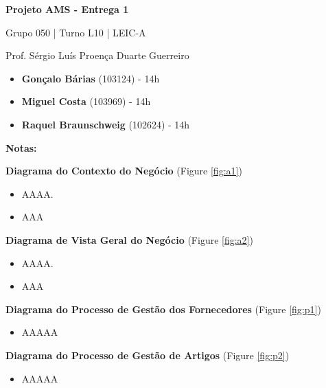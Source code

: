 \documentclass[12pt,a4paper]{article}
\begin{document}
\begin{titlepage}
  \begin{center}
    \vspace*{5cm}
    \Huge
    \textbf{Projeto AMS - Entrega 1}

    \vspace{0.5cm}
    \LARGE
    Grupo 050 | Turno L10 | LEIC-A

    \vspace{0.5cm}
    \large
    Prof. Sérgio Luís Proença Duarte Guerreiro

    \vfill
    \large
    \begin{minipage}{0.8\textwidth}
      \begin{itemize}
        \item[] \textbf{Gonçalo Bárias} (103124) - 14h
        \item[] \textbf{Miguel Costa} (103969) - 14h
        \item[] \textbf{Raquel Braunschweig} (102624) - 14h
      \end{itemize}
    \end{minipage}
  \end{center}
\end{titlepage}

\begin{tcolorbox}[enhanced jigsaw,colback=bg,boxrule=0pt,arc=4pt]
  \begin{large}
    \textbf{Notas:}
  \end{large}

  \begin{small}
    \textbf{Diagrama do Contexto do Negócio} (Figure \ref{fig:a1})
  \end{small}
  \begin{itemize}
    \item AAAA.
    \item AAA
  \end{itemize}

  \begin{small}
    \textbf{Diagrama de Vista Geral do Negócio} (Figure \ref{fig:a2})
  \end{small}
  \begin{itemize}
    \item AAAA.
    \item AAA
  \end{itemize}

  \begin{small}
    \textbf{Diagrama do Processo de Gestão dos Fornecedores} (Figure \ref{fig:p1})
  \end{small}
  \begin{itemize}
    \item AAAAA
  \end{itemize}

  \begin{small}
    \textbf{Diagrama do Processo de Gestão de Artigos} (Figure \ref{fig:p2})
  \end{small}
  \begin{itemize}
    \item AAAAA
  \end{itemize}
\end{tcolorbox}
\end{document}
